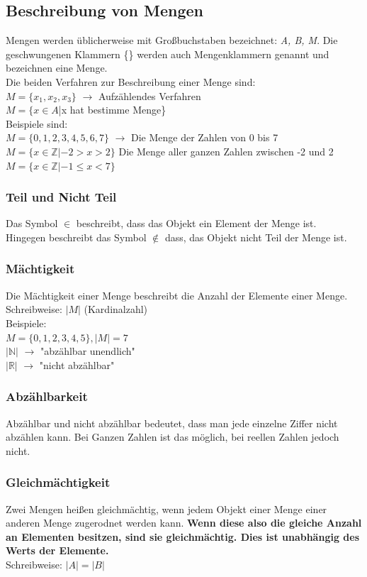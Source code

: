\documentclass{article}
\newcommand{\N}{\mathbb{N}}
\newcommand{\Z}{\mathbb{Z}}
\newcommand{\R}{\mathbb{R}}
\begin{document}
	\subsection{Beschreibung von Mengen}
	Mengen werden üblicherweise mit Großbuchstaben bezeichnet: \textit{A, B, M}. Die geschwungenen Klammern \{\} werden auch Mengenklammern genannt und bezeichnen eine Menge. \\
	Die beiden Verfahren zur Beschreibung einer Menge sind: \\
	$M=\{x_1,x_2,x_3\}$ $\to$ Aufzählendes Verfahren \\
	$M=\{x \in A$|x hat bestimme Menge\} \\
	Beispiele sind: \\
	$M=\{0,1,2,3,4,5,6,7\}$ $\to$ Die Menge der Zahlen von 0 bis 7 \\
	$M=\{x\in \Z | -2 > x > 2\}$ Die Menge aller ganzen Zahlen zwischen -2 und 2\\
	$M=\{x\in \Z | -1 \leq x < 7\}$
	\subsubsection{Teil und Nicht Teil}
	Das Symbol $\in$ beschreibt, dass das Objekt ein Element der Menge ist. \\
	Hingegen beschreibt das Symbol $\notin$ dass, das Objekt nicht Teil der Menge ist.
	\subsubsection{Mächtigkeit}
	Die Mächtigkeit einer Menge beschreibt die Anzahl der Elemente einer Menge. \\
	Schreibweise: $|M|$ (Kardinalzahl) \\
	Beispiele: \\
	$M=\{0,1,2,3,4,5\}, |M| = 7$ \\
	$|\N|$ $\to$ "abzählbar unendlich" \\
	$|\R|$ $\to$ "nicht abzählbar"
	\subsubsection{Abzählbarkeit}
	Abzählbar und nicht abzählbar bedeutet, dass man jede einzelne Ziffer nicht abzählen kann. Bei Ganzen Zahlen ist das möglich, bei reellen Zahlen jedoch nicht.
	\subsubsection{Gleichmächtigkeit}
	Zwei Mengen heißen gleichmächtig, wenn jedem Objekt einer Menge einer anderen Menge zugerodnet werden kann. \textbf{Wenn diese also die gleiche Anzahl an Elementen besitzen, sind sie gleichmächtig. Dies ist unabhängig des Werts der Elemente.} \\
	Schreibweise: $|A| = |B|$
\end{document}
